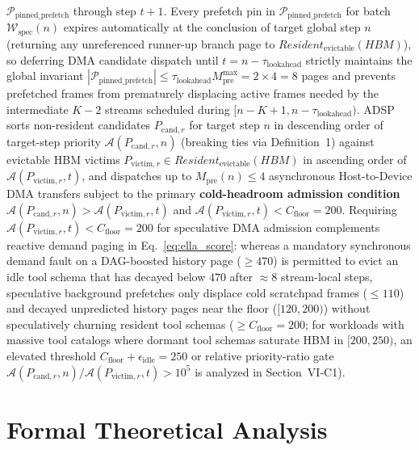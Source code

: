 \documentclass[conference,10pt]{IEEEtran}
\begin{document}
$\mathcal{P}_{\text{pinned\_prefetch}}$ through step $t+1$. Every prefetch pin in $\mathcal{P}_{\text{pinned\_prefetch}}$ for batch $\mathcal{W}_{\text{spec}}(n)$ expires automatically at the conclusion of target global step $n$ (returning any unreferenced runner-up branch page to $\textit{Resident}_{\text{evictable}}(\textit{HBM})$), so deferring DMA candidate dispatch until $t = n - \tau_{\text{lookahead}}$ strictly maintains the global invariant $|\mathcal{P}_{\text{pinned\_prefetch}}| \le \tau_{\text{lookahead}}M_{\text{pre}}^{\max} = 2 \times 4 = 8$ pages and prevents prefetched frames from prematurely displacing active frames needed by the intermediate $K-2$ streams scheduled during $[n-K+1, n-\tau_{\text{lookahead}})$. ADSP sorts non-resident candidates $P_{\text{cand}, r}$ for target step $n$ in descending order of target-step priority $\mathcal{A}(P_{\text{cand}, r}, n)$ (breaking ties via Definition~1) against evictable HBM victims $P_{\text{victim}, r} \in \textit{Resident}_{\text{evictable}}(\textit{HBM})$ in ascending order of $\mathcal{A}(P_{\text{victim}, r}, t)$, and dispatches up to $M_{\text{pre}}(n) \le 4$ asynchronous Host-to-Device DMA transfers subject to the primary \textbf{cold-headroom admission condition} $\mathcal{A}(P_{\text{cand}, r}, n) > \mathcal{A}(P_{\text{victim}, r}, t)$ and $\mathcal{A}(P_{\text{victim}, r}, t) < C_{\text{floor}} = 200$. Requiring $\mathcal{A}(P_{\text{victim}, r}, t) < C_{\text{floor}} = 200$ for speculative DMA admission complements reactive demand paging in Eq.~\eqref{eq:ella_score}: whereas a mandatory synchronous demand fault on a DAG-boosted history page ($\ge 470$) is permitted to evict an idle tool schema that has decayed below $470$ after $\approx 8$ stream-local steps, speculative background prefetches only displace cold scratchpad frames ($\le 110$) and decayed unpredicted history pages near the floor ($[120, 200)$) without speculatively churning resident tool schemas ($\ge C_{\text{floor}} = 200$; for workloads with massive tool catalogs where dormant tool schemas saturate HBM in $[200, 250)$, an elevated threshold $C_{\text{floor}} + \epsilon_{\text{idle}} = 250$ or relative priority-ratio gate $\mathcal{A}(P_{\text{cand}, r}, n)/\mathcal{A}(P_{\text{victim}, r}, t) > 10^5$ is analyzed in Section~VI-C1).

\section{Formal Theoretical Analysis}
\end{document}
